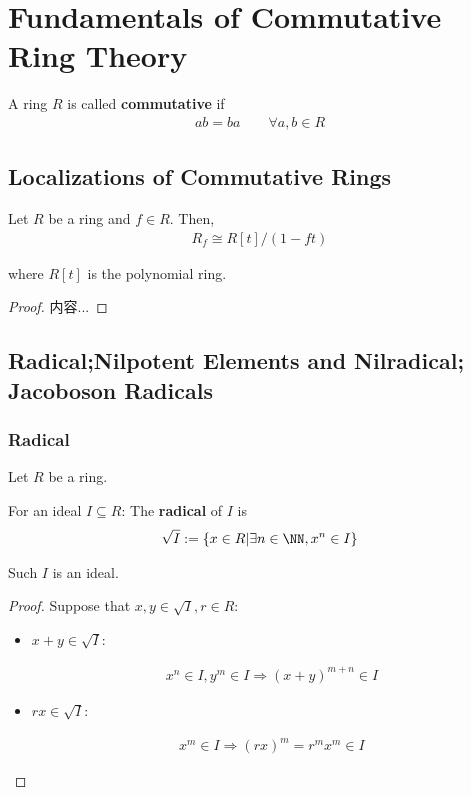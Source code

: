 \documentclass[Total.tex]{subfiles}
\begin{document}
		\chapter{Fundamentals of Commutative Ring Theory}
			\begin{Def}
				A ring $R$ is called \textbf{commutative} if 
				\begin{gather*}
					ab=ba\qquad \forall a,b\in R
				\end{gather*}
			\end{Def}
			
			\section{Localizations of Commutative Rings}
			
				\begin{proposition}
					Let $R$ be a ring and $f\in R$. Then,
					\begin{gather*}
						R_f\cong R[t]/(1-ft)
					\end{gather*}
					
					where $R[t]$ is the polynomial ring. 
				\end{proposition}
				\begin{proof}
					内容...
				\end{proof}
			\section{Radical;Nilpotent Elements and Nilradical; Jacoboson Radicals}
				\subsection{Radical}
					\begin{Def}
						Let $R$ be a ring.
						
						For an ideal $I\subseteq R$: The \textbf{radical} of $I$ is
						\begin{gather*}
							\sqrt{I}:=\{x\in R|\exists n\in \NN, x^n\in I\}
						\end{gather*}
					\end{Def}
					
					\begin{lemma}
						Such $I$ is an ideal. 
					\end{lemma}
					\begin{proof}
						Suppose that $x,y\in \sqrt{I},r\in R$:
						\begin{itemize}
							\item $x+y\in \sqrt{I}$:
							
							\begin{gather*}
								x^n\in I,y^m\in I\Rightarrow (x+y)^{m+n}\in I
							\end{gather*}
							
							\item $rx\in \sqrt{I}$: 
							
							\begin{gather*}
								x^m\in I\Rightarrow (rx)^m=r^mx^m\in I
							\end{gather*}
						\end{itemize}
					\end{proof}
\end{document}
